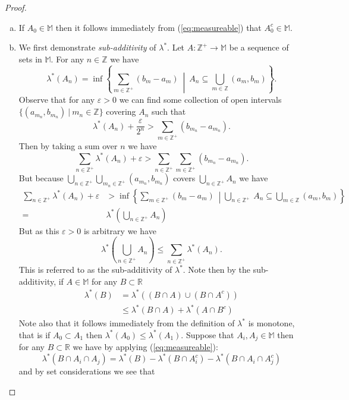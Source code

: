 \documentclass{report}
\newcommand{\Z}{\mathbb{Z}}
\newcommand{\R}{\mathbb{R}}
\newcommand{\M}{\mathbb{M}}
\begin{document}
\begin{proof}
\begin{enumerate}[(a)]
\item If $A_0 \in \M$ then it follows immediately from (\ref{eq:measureable}) that $A_0^c \in \M$.
\item We first demonstrate \emph{sub-additivity} of $\lambda^\ast$. Let $A: \Z^+ \to \M$ be a sequence of sets in $\M$. For any $n \in \Z$ we have
$$
\lambda^\ast ( A_n)=\inf \left \{ \sum_{{m}\in \Z^+}(b_{m}-a_{m})  \  \middle| \ A_n \subseteq \bigcup_{{m} \in \Z} (a_m,b_m) \right \}.
$$
Observe that for any $\varepsilon > 0$ we can find some collection of open intervals $\{ (a_{m_n},b_{m_n}) \ | \ m_n\in \Z \}$ covering $A_n$ such that
$$
\lambda^\ast (A_n)+\frac{\varepsilon}{2^n} > \sum_{m \in \Z^+} (b_{m_n} - a_{m_n}).
$$
Then by taking a sum over $n$ we have
$$
\sum_{n \in \Z^+} \lambda^\ast (A_n)+\varepsilon > \sum_{n \in \Z^+}\sum_{m \in \Z^+} (b_{m_n} - a_{m_n}).
$$
But because $\bigcup_{n \in \Z^+} \bigcup_{m_n \in \Z^+}(a_{m_n},b_{m_n})$ covers $\bigcup_{n \in \Z^+} A_n$ we have
\begin{align*}
\sum_{n \in \Z^+} \lambda^\ast (A_n)+\varepsilon &> \inf \left \{ \sum_{{m}\in \Z^+}(b_{m}-a_{m})  \  \middle| \bigcup_{n \in \Z^+}\ A_n \subseteq \bigcup_{{m} \in \Z} (a_m,b_m) \right \} \\
=& \lambda^\ast \left( \bigcup_{n \in \Z^+} A_n \right)
\end{align*}
But as this $\varepsilon >0$ is arbitrary we have
\begin{equation}
\label{eq:subad}
\lambda^\ast \left( \bigcup_{n \in \Z^+} A_n \right) \leq \sum_{n \in \Z^+} \lambda^\ast (A_n).
\end{equation}
This is referred to as the sub-additivity of $\lambda^\ast$.
Note then by the sub-additivity, if $A \in \M$ for any $B \subset \R$ 
\begin{align}
\lambda^\ast(B)&=\lambda^\ast \left( (B\cap A) \cup (B\cap A^c) \right)\\
&\label{subadd} \leq \lambda^\ast (B\cap A) + \lambda^\ast \left( A\cap B^c \right )
\end{align}
Note also that it follows immediately from the definition of $\lambda^\ast$ is monotone, that is if $A_0 \subset A_1$ then $\lambda^\ast(A_0) \leq \lambda^\ast(A_1)$. Suppose that $A_i,A_j \in \M$ then for any $B\subset \R$ we have by applying (\ref{eq:measureable}):
$$\lambda^\ast(B\cap A_i \cap A_j)=\lambda^\ast(B)-\lambda^\ast(B\cap A_i^c)-\lambda^\ast(B\cap A_i \cap A_j^c)$$
and by set considerations we see that

\end{enumerate}
\end{proof}
\end{document}

